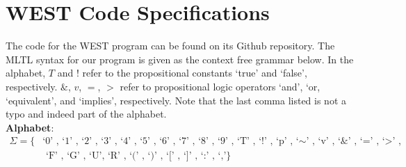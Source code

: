 \documentclass[runningheads]{llncs}
\begin{document}
\section{WEST Code Specifications} \label{specs}
The code for the WEST program can be found on its %
{Github} repository. The MLTL syntax for our program is given as the context free grammar below. In the alphabet, $T$ and $!$ refer to the propositional constants `true' and `false', respectively. $\&$, $v$, $=$, $>$ refer to propositional logic operators `and', `or, `equivalent', and `implies', respectively. Note that the last comma listed is not a typo and indeed part of the alphabet. \\
\textbf{Alphabet}: 
\begin{align*}
    \Sigma = \{&\text{`0' , `1' , `2' , `3' , `4' , `5' , `6' , `7' , `8' , `9' , `T' , `!' , `p' , `$\scriptstyle{\sim}$' , `v' , `\&' , `=' , `>' ,}\\
    &\text{ `F' , `G' , `U', `R' , `(' , `)' , `[' , `]' , `:' , `,'}\}
\end{align*}
\end{document}
